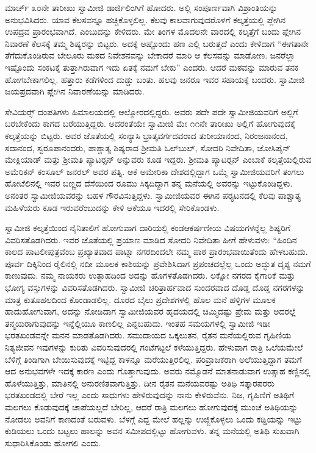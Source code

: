  ಮಾರ್ಚ್ ೩೦ನೇ ತಾರೀಖು ಸ್ವಾಮೀಜಿ ಡಾರ್ಜಿಲಿಂಗಿಗೆ ಹೋದರು. ಅಲ್ಲಿ ಸಂಪೂರ್ಣವಾಗಿ ವಿಶ್ರಾಂತಿಯನ್ನು ಅನುಭವಿಸಿದರು. ಯಾವ ಕೆಲಸವನ್ನೂ ಹಚ್ಚಿಕೊಳ್ಳಲಿಲ್ಲ. ಕೆಲವು ಕಾಲವಾಗುವುದರೊಳಗೆ ಕಲ್ಕತ್ತೆಯಲ್ಲಿ ಪ್ಲೇಗಿನ ಉಪದ್ರವ ಪ್ರಾರಂಭವಾಗಿದೆ, ಎಂಬುದನ್ನು ಕೇಳಿದರು. ಮೇ ತಿಂಗಳ ಮೊದಲನೇ ವಾರದಲ್ಲಿ ಕಲ್ಕತ್ತೆಗೆ ಬಂದು ಪ್ಲೇಗಿನ ನಿವಾರಣೆ ಕೆಲಸಕ್ಕೆ ತಮ್ಮ ಶಿಷ್ಯರನ್ನು ಬಿಟ್ಟರು. ಅದಕ್ಕೆ ಅಷ್ಟೊಂದು ಹಣ ಎಲ್ಲಿ ಬರುತ್ತದೆ ಎಂದು ಕೇಳಿದಾಗ “ಈಗತಾನೇ ತೆಗೆದುಕೊಂಡಿರುವ ಬೇಲೂರು ಮಠದ ನಿವೇಶನವನ್ನು ಬೇಕಾದರೆ ಮಾರಿ ಆ ಕೆಲಸವನ್ನು ಮಾಡೋಣ. ಜನರೆಲ್ಲಾ ಇಷ್ಟೊಂದು ಸಂಕಟಕ್ಕೆ ತುತ್ತಾಗಿರುವಾಗ ಇದು ಏತಕ್ಕೆ ನಮಗೆ ಬೇಕು” ಎಂದರು. ಆದರೆ ಮಠವನ್ನು ಮಾರುವ ತನಕ ಹೋಗಬೇಕಾಗಲಿಲ್ಲ. ಹತ್ತಾರು ಕಡೆಗಳಿಂದ ದುಡ್ಡು ಬಂತು. ಹಲವು ಜನರೂ ಇವರ ಸಹಾಯಕ್ಕೆ ಬಂದರು. ಸ್ವಾಮೀಜಿ ಜಯಪ್ರದವಾಗಿ ಪ್ಲೇಗಿನ ನಿವಾರಣೆಯನ್ನು ಮಾಡಿದರು. 

 ಸೇವಿಯರ್ಸ್‍‍ ದಂಪತಿಗಳು ಹಿಮಾಲಯದಲ್ಲಿ ಆಲ್ಮೋರದಲ್ಲಿದ್ದರು. ಅವರು ಪದೇ ಪದೇ ಸ್ವಾಮೀಜಿಯವರಿಗೆ ಅಲ್ಲಿಗೆ ಬರಬೇಕೆಂದು ಕಾಗದ ಬರೆಯುತ್ತಿದ್ದರು. ಅದರಂತೆಯೇ ಸ್ವಾಮೀಜಿ ಮೇ ೧೧ನೇ ತಾರೀಖು ಅಲ್ಲಿಗೆ ಹೋಗುವುದಕ್ಕೆ ಕಲ್ಕತ್ತೆಯನ್ನು ಬಿಟ್ಟರು. ಅವರ ಜೊತೆಯಲ್ಲಿ ಸಂನ್ಯಾಸಿ ಭ್ರಾತೃವರ್ಗದವರಾದ ತುರೀಯಾನಂದ, ನಿರಂಜನಾನಂದ, ಸದಾನಂದ, ಸ್ವರೂಪಾನಂದರು, ಪಾಶ್ಚಾತ್ಯ ಶಿಷ್ಯರಾದ ಶ‍್ರೀಮತಿ ಓಲ್‍ಬುಲ್, ಸೋದರಿ ನಿವೇದಿತಾ, ಜೋಸಿಪೈನ್ ಮೇಕ್ಲಿಯಾಡ್ ಮತ್ತು ಶ‍್ರೀಮತಿ ಪ್ಯಾಟರ್‍ಸನ್ ಅನ್ನುವರು ಕೂಡ ಇದ್ದರು. ಶ‍್ರೀಮತಿ ಪ್ಯಾಟರ್‍ಸನ್ ಎಂಬಾಕೆ ಕಲ್ಕತ್ತೆಯಲ್ಲಿರುವ ಅಮೆರಿಕನ್ ಕಂಸೂಲ್ ಜನರಲ್ ಅವರ ಪತ್ನಿ. ಆಕೆ ಅಮೇರಿಕಾ ದೇಶದಲ್ಲಿದ್ದಾಗ ಒಮ್ಮೆ ಸ್ವಾಮೀಜಿಯವರಿಗೆ ತಂಗಲು ಹೋಟೆಲಿನಲ್ಲಿ ಇವರ ಬಣ್ಣದ ದೆಸೆಯಿಂದ ರೂಮು ಸಿಕ್ಕದಿದ್ದಾಗ ತನ್ನ ಮನೆಯಲ್ಲಿ ಅವರನ್ನು ಇಟ್ಟುಕೊಂಡಿದ್ದಳು. ಅನಂತರ ಸ್ವಾಮೀಜಿಯವರನ್ನು ಬಹಳ ಗೌರವಿಸುತ್ತಿದ್ದಳು. ಸ್ವಾಮೀಜಿಯವರ ಈಗಿನ ಪರ‍್ಯಟನದಲ್ಲಿ ಕೆಲವು ಪಾಶ್ಚಾತ್ಯ ಮಹಿಳೆಯರು ಕೂಡ ಇರುವರೆಂಬುದನ್ನು ಕೇಳಿ ಆಕೆಯೂ ಇದರಲ್ಲಿ ಸೇರಿಕೊಂಡಳು. 

 ಸ್ವಾಮೀಜಿ ಕಲ್ಕತ್ತೆಯಿಂದ ನೈನಿತಾಲಿಗೆ ಹೋಗುವಾಗ ದಾರಿಯಲ್ಲಿ ಕಂಡ\break ಆಕರ್ಷಣೀಯ ವಿಷಯಗಳನ್ನೆಲ್ಲ ಶಿಷ್ಯರಿಗೆ ವಿವರಿಸತೊಡಗಿದರು. ಇವರ ಜೊತೆಯಲ್ಲಿ ಪ್ರಯಾಣ ಮಾಡಿದ ಸೋದರಿ ನಿವೇದಿತಾ ಹೀಗೆ ಹೇಳುವಳು: “ಹಿಂದಿನ ಕಾಲದ ಪಾಟಲೀಪುತ್ರವೆಂಬ ಪ್ರಖ್ಯಾತವಾದ ಪಾಟ್ನಾ ನಗರದಿಂದಲೇ ನಮ್ಮ ಪಾಠ ಪ್ರಾರಂಭವಾಯಿತೆಂದು ಹೇಳಬಹುದು. ಪೂರ್ವ ದಿಕ್ಕಿನಿಂದ ರೈಲಿನಲ್ಲಿ ನದೀ ಮೂಲಕ ಕಾಶಿಯನ್ನು ಪ್ರವೇಶಿಸಿದಾಗ ಪ್ರಪಂಚದಲ್ಲೆಲ್ಲ ಒಂದು ಅದ್ಭುತ ದೃಶ್ಯ ನಮಗೆ ಕಾಣುವುದು. ನಮ್ಮ ನಾಯಕರು ಉತ್ಸಾಹದಿಂದ ಅದನ್ನು ಹೊಗಳತೊಡಗಿದರು. ಲಕ್ನೋ ನಗರದ ಕೈಗಾರಿಕೆ ಮತ್ತು ಭೋಗ್ಯ ವಸ್ತುಗಳನ್ನು ವಿವರಿಸತೊಡಗಿದರು. ಸ್ವಾಮೀಜಿ ಚರಿತ್ರಾರ್ಹವಾದ ಸುಂದರವಾದ ದೊಡ್ಡ ದೊಡ್ಡ ನಗರಗಳನ್ನು ಮಾತ್ರ ಕುತೂಹಲದಿಂದ ಕೊಂಡಾಡಲಿಲ್ಲ. ದೂರದ ಬೈಲು ಪ್ರದೇಶಗಳಲ್ಲಿ ಹೊಲ ಮನೆ ಹಳ್ಳಿಗಳ ಮೂಲಕ ಹಾದುಹೋಗುವಾಗ, ಅದನ್ನು ನೋಡಿದಾಗ ಸ್ವಾಮೀಜಿಯವರ ಹೃದಯದಲ್ಲಿ ಚಿಮ್ಮಿದಷ್ಟು ಪ್ರೇಮ ಮತ್ತು ಅದರಲ್ಲೆ ತನ್ಮಯರಾಗುವುದನ್ನು ಇನ್ನೆಲ್ಲಿಯೂ ಕಾಣಲಿಲ್ಲ ಎನ್ನಬಹುದು. ಇಂತಹ ಸಮಯಗಳಲ್ಲಿ ಸ್ವಾಮೀಜಿ ಇಡೀ ಭರತಖಂಡವನ್ನೇ ಮನನ ಮಾಡತೊಡಗಿದರು. ಸಮುದಾಯದ ಒಕ್ಕಲುತನ, ರೈತನ ಮನೆಯಲ್ಲಿರುವ ಗೃಹಿಣಿಯ ನಿತ್ಯಜೀವನ ಇವುಗಳನ್ನು ಕುರಿತು ವಿವರಿಸುವುದರಲ್ಲಿ ಗಂಟೆಗಟ್ಟಲೆ ಕಳೆಯುತ್ತಿದ್ದರು. ಹೇಳುವಾಗ ರಾತ್ರಿ ಒಲೆಯಮೇಲೆ ಬೆಳಿಗ್ಗೆ ತಿಂಡಿಗಾಗಿ ಬೇಯಿಸುವುದಕ್ಕೆ ಇಟ್ಟಿದ್ದ ಕಾಳನ್ನೂ ಮರೆಯುತ್ತಿರಲಿಲ್ಲ. ಪರಿವ್ರಾಜಕರಾಗಿ ಅಲೆಯುತ್ತಿದ್ದಾಗ ತಮಗೆ ಆದ ಅನುಭವಗಳೇ ಇದಕ್ಕೆ ಕಾರಣ ಎಂದು ಗೊತ್ತಾಗುವುದು. ಅವರು ನಮ್ಮೊಡನೆ ಮಾತನಾಡುವಾಗ ಉತ್ಸಾಹ ಕಣ್ಣಿನಲ್ಲಿ ಹೊಳೆಯುತ್ತಿತ್ತು, ಮಾತಿನಲ್ಲಿ ಅನುರಣಿತವಾಗುತ್ತಿತ್ತು. ದೀನ ರೈತನ ಮನೆಯವರಷ್ಟು ಅತಿಥಿ ಸತ್ಕಾರಪರರು ಭರತಖಂಡದಲ್ಲಿ ಬೇರೆ ಇಲ್ಲ ಎಂದು ಸಾಧುಗಳು ಹೇಳಿರುವುದನ್ನು ನಾನು ಕೇಳಿರುವೆನು. ನಿಜ, ಗೃಹಿಣಿಗೆ ಅತಿಥಿಗೆ ಮಲಗಲು ಕೊಡುವುದಕ್ಕೆ ಚಾಪೆಯಲ್ಲದೆ ಬೇರಿಲ್ಲ, ಆದರೆ ರಾತ್ರಿ ಮಲಗಲು ಹೋಗುವುದಕ್ಕೆ ಮುಂಚೆ ಅತಿಥಿಯನ್ನು ನೋಡಲು ಅವನಿಗೆ ಕಾಣದಂತೆ ಬರುವಳು. ಬೆಳಗ್ಗೆ ಎದ್ದ ಮೇಲೆ ಹಲ್ಲನ್ನು ಉಜ್ಜಿಕೊಳ್ಳಲು ಒಂದು ಕಡ್ಡಿಯನ್ನು ಇಟ್ಟು ಕುಡಿಯಲು ಒಂದು ಬಟ್ಟಲು ಹಾಲನ್ನು ಅವನ ಸಮೀಪದಲ್ಲಿಟ್ಟು ಹೋಗುವಳು. ತನ್ನ ಮನೆಯಲ್ಲಿ ಅತಿಥಿ ಸುಖವಾಗಿ ಸುಧಾರಿಸಿಕೊಂಡು ಹೋಗಲಿ ಎಂದು. 

